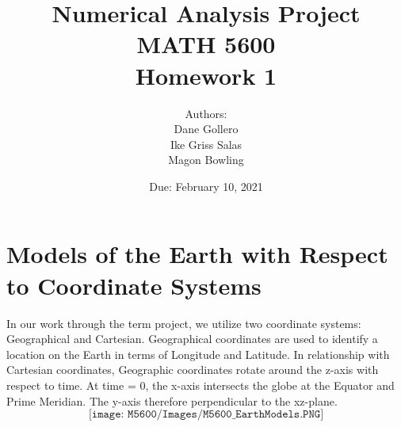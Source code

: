 \documentclass[11pt]{article}
\theoremstyle{definition}
\newcommand{\1}[1]{\mathbf{1} \left \{ #1 \right \}}
\begin{document}
\title{Numerical Analysis Project \\ MATH 5600 \\ Homework 1}
\date{Due: February 10, 2021}
\author{Authors: \\ Dane Gollero \\ Ike Griss Salas \\ Magon Bowling}

\maketitle

\section*{\textbf{Models of the Earth with Respect to Coordinate Systems}}
In our work through the term project, we utilize two coordinate systems: Geographical and Cartesian.  Geographical coordinates are used to identify a location on the Earth in terms of Longitude and Latitude.  In relationship with Cartesian coordinates, Geographic coordinates rotate around the z-axis with respect to time.  At time = 0, the x-axis intersects the globe at the Equator and Prime Meridian.  The y-axis therefore perpendicular to the xz-plane.
\[\texttt{[image: M5600/Images/M5600\_EarthModels.PNG]}\]
\end{document}
